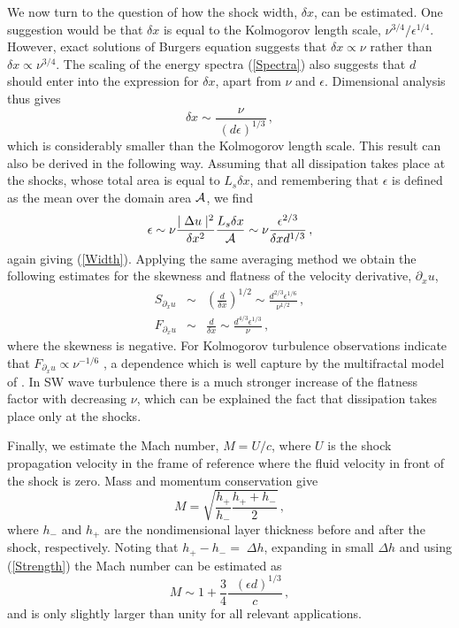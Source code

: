 \documentclass{jfm}
\begin{document}
We now turn to the question of how the shock width, $ \delta x $, can be estimated. One suggestion would be that $ \delta x $  is equal to the Kolmogorov length scale, $ \nu^{3/4}/\epsilon^{1/4} $. However, exact solutions of Burgers equation \cite[see for example][]{Whitham}
suggests that  $ \delta x \propto \nu $ rather than $ \delta x \propto \nu ^{3/4} $. The scaling of the energy spectra (\ref{Spectra}) also suggests that $ d $ should enter into the expression for $ \delta x$, apart from $ \nu $ and $ \epsilon $. Dimensional analysis thus gives
\begin{equation} \label{Width}
\delta x \sim \frac{\nu}{\; (d\epsilon)^{1/3}} \, ,
\end{equation} 
which is considerably smaller than the Kolmogorov length scale.
This result can also be derived in the following way. Assuming that all dissipation takes place at the shocks, whose total area is equal to $ L_s \delta x $,  and remembering that $ \epsilon $ is defined as the mean over the domain area $ \cal  A$, we find
\begin{equation} \label{Estimate}
\epsilon \sim \nu \frac{ \mid \Delta u \mid ^{2} }{\delta x^2} \frac{L_s \delta x}{\cal{A}} \sim \nu \frac{\epsilon^{2/3}} {\delta x d^{1/3}} \, ,
\end{equation} 
again giving (\ref{Width}). 
Applying the same averaging method we obtain the following estimates for the skewness and flatness of the velocity derivative, $ \partial_x u $,
\begin{eqnarray}
S_{\partial_x u}  & \sim & \left ( \frac{d}{\delta x} \right )^{1/2} \sim \frac{d^{2/3} \epsilon ^{1/6}}{\nu^{1/2}} \, , \\
\label{FD} F_{\partial_x u} & \sim &  \frac{d}{\delta x} \sim \frac{d^{4/3} \epsilon^{1/3}} {\nu} \, ,
\end{eqnarray} 
where the skewness is negative. For Kolmogorov turbulence observations indicate that $ F_{\partial_x u} \propto \nu^{-1/6} $  \cite[]{VanAtta_Antonia1980}, a dependence which is well capture by the multifractal model of
\cite{Meneveau_Streenivasan1991}.  In SW wave turbulence there is a much stronger increase of  the flatness factor with decreasing  $ \nu $, which can be explained the fact that dissipation takes place only at the shocks.

Finally, we estimate the Mach number, $ M = U/c $, where $ U $ is the shock propagation velocity in the frame of reference where the fluid velocity in front of the shock is zero. 
Mass and momentum conservation give \cite[see][]{Baines1998} 
\begin{equation}
M = \sqrt{\frac{h_+}{h_-} \frac{h_+  + h_-}{2}} \, ,
\end{equation} 
where $ h_- $ and $ h_+ $ are the nondimensional layer thickness before and after the shock, respectively. Noting that $ h_+ - h_- =  \;  \Delta h  $, expanding in small $ \Delta h  $ and using (\ref{Strength}) the Mach number can be estimated as
\begin{equation} \label{Mach}
M \sim 1 + \frac{3}{4} \frac{\;\; (\epsilon d)^{1/3}}{c} \, ,
\end{equation} 
and is only slightly larger than unity for all relevant applications.
\end{document}
